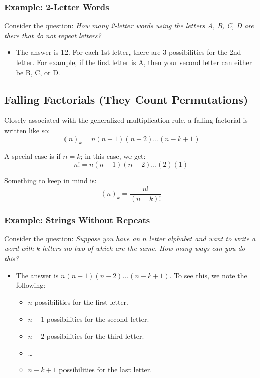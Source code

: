 \documentclass[letterpaper]{article}
\begin{document}
\subsubsection{Example: 2-Letter Words}
Consider the question: \emph{How many 2-letter words using the letters A, B, C, D are there that do not repeat letters?} 

\begin{itemize}
    \item The answer is 12. For each 1st letter, there are 3 possibilities for the 2nd letter. For example, if the first letter is A, then your second letter can either be B, C, or D.
\end{itemize}

\subsection{Falling Factorials (They Count Permutations)}
Closely associated with the generalized multiplication rule, a falling factorial is written like so:
\[(n)_k = n(n - 1)(n - 2)...(n - k + 1)\]

\bigskip

A special case is if $n = k$; in this case, we get:
\[n! = n(n - 1)(n - 2)...(2)(1)\]

\bigskip 

Something to keep in mind is:
\[(n)_k = \frac{n!}{(n - k)!}\]

\subsubsection{Example: Strings Without Repeats}
Consider the question: \emph{Suppose you have an $n$ letter alphabet and want to write a word with $k$ letters no two of which are the same. How many ways can you do this?} 

\begin{itemize}
    \item The answer is $n(n - 1)(n - 2)\dots(n - k + 1)$. To see this, we note the following:
    \begin{itemize}
        \item $n$ possibilities for the first letter.
        \item $n - 1$ possibilities for the second letter.
        \item $n - 2$ possibilities for the third letter.
        \item \dots
        \item $n - k + 1$ possibilities for the last letter.
    \end{itemize}
\end{itemize}
\end{document}
